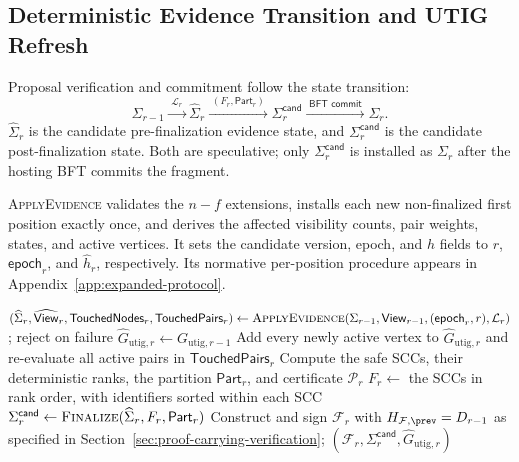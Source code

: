 \subsection{Deterministic Evidence Transition and UTIG Refresh}
\label{sec:evidence-transition}

Proposal verification and commitment follow the state transition:
\begin{equation}
 \Sigma_{r-1}\xrightarrow{\;\mathcal L_r\;}
 \widehat\Sigma_r
 \xrightarrow{\;(F_r,\mathsf{Part}_r)\;}
 \Sigma_r^{\mathsf{cand}}
 \xrightarrow{\;\textsf{BFT commit}\;}\Sigma_r.
 \label{eq:proposal-state-transition}
\end{equation}
$\widehat\Sigma_r$ is the candidate pre-finalization evidence state, and
$\Sigma_r^{\mathsf{cand}}$ is the candidate post-finalization state.  Both are
speculative; only $\Sigma_r^{\mathsf{cand}}$ is installed as $\Sigma_r$ after
the hosting BFT commits the fragment.

\textsc{ApplyEvidence} validates the $n-f$ extensions, installs each new
non-finalized first position exactly once, and derives the affected visibility
counts, pair weights, states, and active vertices.  It sets the candidate
version, epoch, and $h$ fields to $r$, $\mathsf{epoch}_r$, and
$\widehat h_r$, respectively.  Its normative per-position procedure appears in
Appendix~\ref{app:expanded-protocol}.

\begin{algorithm}[h!]
\caption{\textsc{BuildFragment}: Leader-Side Construction}
\label{alg:build-fragment}
\footnotesize
{}
$(\widehat\Sigma_r,\widehat{\mathsf{View}}_r,
  \mathsf{TouchedNodes}_r,\mathsf{TouchedPairs}_r)
  \gets\textsc{ApplyEvidence}(\Sigma_{r-1},\mathsf{View}_{r-1},
  (\mathsf{epoch}_r,r),\mathcal L_r)$; reject on failure\;
$\widehat G_{\mathrm{utig},r}\gets G_{\mathrm{utig},r-1}$\;
Add every newly active vertex to $\widehat G_{\mathrm{utig},r}$ and
re-evaluate all active pairs in $\mathsf{TouchedPairs}_r$\;
Compute the safe SCCs, their deterministic ranks, the partition
$\mathsf{Part}_r$, and certificate $\mathcal P_r$\;
$F_r\gets$ the SCCs in rank order, with identifiers sorted within each SCC\;
$\Sigma_r^{\mathsf{cand}}\gets
  \textsc{Finalize}(\widehat\Sigma_r,F_r,\mathsf{Part}_r)$\;
Construct and sign $\mathcal F_r$ with $H_{\mathcal F,\prev}=D_{r-1}$ as specified in
Section~\ref{sec:proof-carrying-verification}; \KwRet
$(\mathcal F_r,\Sigma_r^{\mathsf{cand}},\widehat G_{\mathrm{utig},r})$\;
\end{algorithm}

